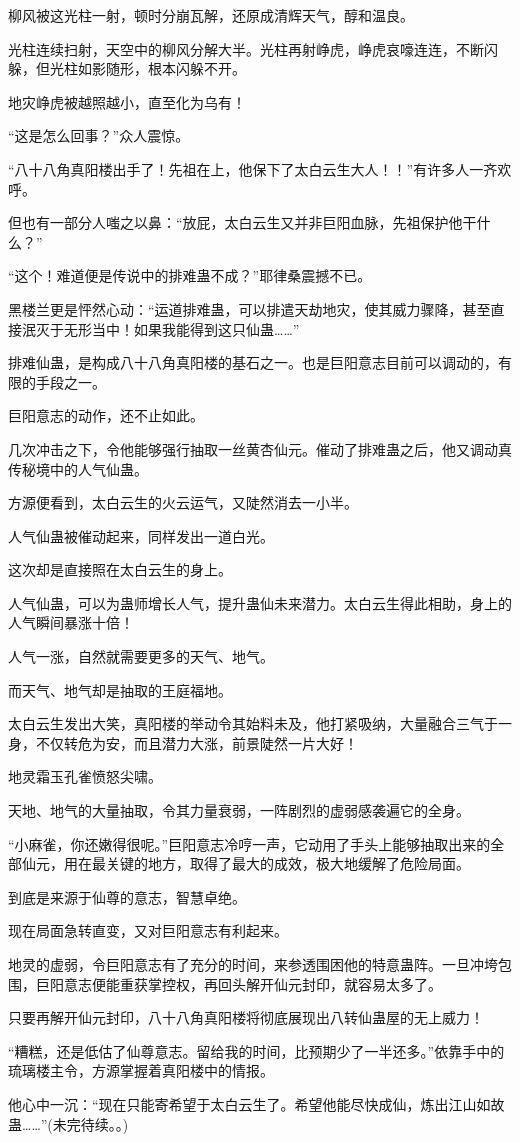 \begin{this_body}
柳风被这光柱一射，顿时分崩瓦解，还原成清辉天气，醇和温良。

光柱连续扫射，天空中的柳风分解大半。光柱再射峥虎，峥虎哀嚎连连，不断闪躲，但光柱如影随形，根本闪躲不开。

地灾峥虎被越照越小，直至化为乌有！

“这是怎么回事？”众人震惊。

“八十八角真阳楼出手了！先祖在上，他保下了太白云生大人！！”有许多人一齐欢呼。

但也有一部分人嗤之以鼻：“放屁，太白云生又并非巨阳血脉，先祖保护他干什么？”

“这个！难道便是传说中的排难蛊不成？”耶律桑震撼不已。

黑楼兰更是怦然心动：“运道排难蛊，可以排遣天劫地灾，使其威力骤降，甚至直接泯灭于无形当中！如果我能得到这只仙蛊……”

排难仙蛊，是构成八十八角真阳楼的基石之一。也是巨阳意志目前可以调动的，有限的手段之一。

巨阳意志的动作，还不止如此。

几次冲击之下，令他能够强行抽取一丝黄杏仙元。催动了排难蛊之后，他又调动真传秘境中的人气仙蛊。

方源便看到，太白云生的火云运气，又陡然消去一小半。

人气仙蛊被催动起来，同样发出一道白光。

这次却是直接照在太白云生的身上。

人气仙蛊，可以为蛊师增长人气，提升蛊仙未来潜力。太白云生得此相助，身上的人气瞬间暴涨十倍！

人气一涨，自然就需要更多的天气、地气。

而天气、地气却是抽取的王庭福地。

太白云生发出大笑，真阳楼的举动令其始料未及，他打紧吸纳，大量融合三气于一身，不仅转危为安，而且潜力大涨，前景陡然一片大好！

地灵霜玉孔雀愤怒尖啸。

天地、地气的大量抽取，令其力量衰弱，一阵剧烈的虚弱感袭遍它的全身。

“小麻雀，你还嫩得很呢。”巨阳意志冷哼一声，它动用了手头上能够抽取出来的全部仙元，用在最关键的地方，取得了最大的成效，极大地缓解了危险局面。

到底是来源于仙尊的意志，智慧卓绝。

现在局面急转直变，又对巨阳意志有利起来。

地灵的虚弱，令巨阳意志有了充分的时间，来参透围困他的特意蛊阵。一旦冲垮包围，巨阳意志便能重获掌控权，再回头解开仙元封印，就容易太多了。

只要再解开仙元封印，八十八角真阳楼将彻底展现出八转仙蛊屋的无上威力！

“糟糕，还是低估了仙尊意志。留给我的时间，比预期少了一半还多。”依靠手中的琉璃楼主令，方源掌握着真阳楼中的情报。

他心中一沉：“现在只能寄希望于太白云生了。希望他能尽快成仙，炼出江山如故蛊……”(未完待续。。)

\end{this_body}

